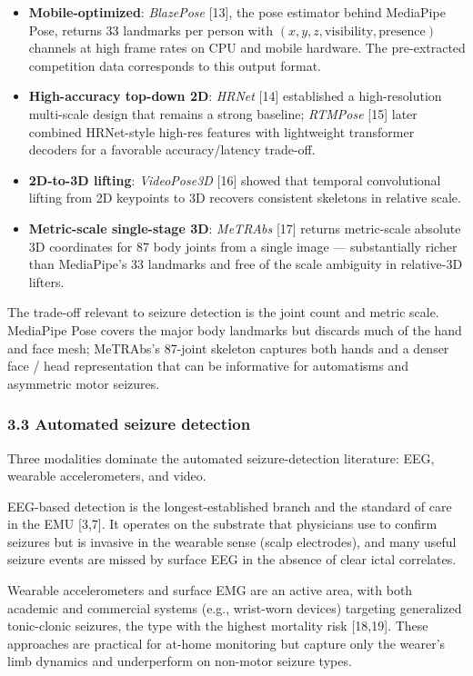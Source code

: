 \documentclass[
  11pt,
]{article}
\providecommand{\tightlist}{%
  \setlength{\itemsep}{0pt}\setlength{\parskip}{0pt}}
\begin{document}
\begin{itemize}
\tightlist
\item
  \textbf{Mobile-optimized}: \emph{BlazePose} {[}13{]}, the pose
  estimator behind MediaPipe Pose, returns 33 landmarks per person with
  \((x, y, z, \text{visibility}, \text{presence})\) channels at high
  frame rates on CPU and mobile hardware. The pre-extracted competition
  data corresponds to this output format.
\item
  \textbf{High-accuracy top-down 2D}: \emph{HRNet} {[}14{]} established
  a high-resolution multi-scale design that remains a strong baseline;
  \emph{RTMPose} {[}15{]} later combined HRNet-style high-res features
  with lightweight transformer decoders for a favorable accuracy/latency
  trade-off.
\item
  \textbf{2D-to-3D lifting}: \emph{VideoPose3D} {[}16{]} showed that
  temporal convolutional lifting from 2D keypoints to 3D recovers
  consistent skeletons in relative scale.
\item
  \textbf{Metric-scale single-stage 3D}: \emph{MeTRAbs} {[}17{]} returns
  metric-scale absolute 3D coordinates for 87 body joints from a single
  image --- substantially richer than MediaPipe's 33 landmarks and free
  of the scale ambiguity in relative-3D lifters.
\end{itemize}

The trade-off relevant to seizure detection is the joint count and
metric scale. MediaPipe Pose covers the major body landmarks but
discards much of the hand and face mesh; MeTRAbs's 87-joint skeleton
captures both hands and a denser face / head representation that can be
informative for automatisms and asymmetric motor seizures.

\subsubsection{3.3 Automated seizure
detection}\label{automated-seizure-detection}

Three modalities dominate the automated seizure-detection literature:
EEG, wearable accelerometers, and video.

EEG-based detection is the longest-established branch and the standard
of care in the EMU {[}3,7{]}. It operates on the substrate that
physicians use to confirm seizures but is invasive in the wearable sense
(scalp electrodes), and many useful seizure events are missed by surface
EEG in the absence of clear ictal correlates.

Wearable accelerometers and surface EMG are an active area, with both
academic and commercial systems (e.g., wrist-worn devices) targeting
generalized tonic-clonic seizures, the type with the highest mortality
risk {[}18,19{]}. These approaches are practical for at-home monitoring
but capture only the wearer's limb dynamics and underperform on
non-motor seizure types.
\end{document}
